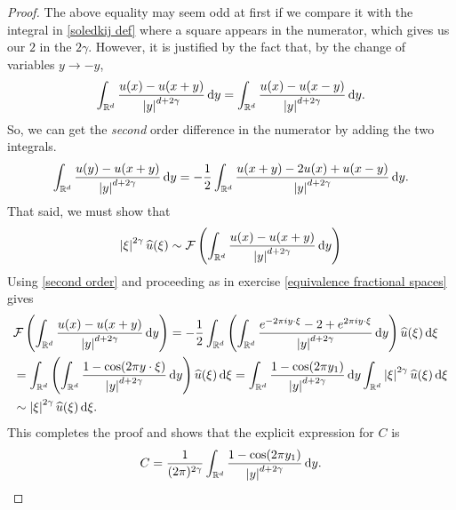 \documentclass[
    a4paper,
    DIV=14,
    abstract=true,
    numbers=noenddot
]
{scrartcl}
\theoremstyle{definition}
\newcommand{\wh}[1]{\widehat{#1}}
\renewcommand{\d}{\,\mathrm{d}}\newcommand{\dx}{\,\mathrm{d}x}
\newcommand{\R}{\mathbb{R}}
\newcommand{\Ff}{\mathcal{F}}
\begin{document}
\begin{proof}
    The above equality may seem odd at first if we compare it with the integral in \ref{soledkij def} where a square appears in the numerator, which gives us our $2$  in the $2 \gamma $. However, it is justified by the fact that, by the change of variables $y \to -y$,
    \begin{align*}
        \int_{\R^d}\frac{u(x)-u(x+y)}{\abs{y}^{d+2\gamma}}\d y=\int_{\R^d}\frac{u(x)-u(x-y)}{\abs{y}^{d+2\gamma}}\d y.
    \end{align*}
    So, we can get the \emph{second} order difference in the numerator by adding the two integrals.
    \begin{align}\label{second order}
        \int_{\R^d}\frac{u(y)-u(x+y)}{\abs{y}^{d+2\gamma}}\d y=-\frac{1}{2}\int_{\R^d}\frac{u(x+y)-2u(x)+u(x-y)}{\abs{y}^{d+2\gamma}}\d y.
    \end{align}
    That said, we must show that
    \begin{align*}
        \abs{\xi}^{2\gamma }\wh{u}(\xi )\sim \Ff \left(\int_{\R^d}\frac{u(x)-u(x+y)}{\abs{y}^{d+2\gamma}}\d y\right)
    \end{align*}
    Using \eqref{second order} and proceeding as in exercise \ref{equivalence fractional spaces} gives
    \begin{align*}
         & \Ff \left(\int_{\R^d}\frac{u(x)-u(x+y)}{\abs{y}^{d+2\gamma}}\d y\right)= -\frac{1}{2} \int_{\R^d}\left(\int_{\R^d}\frac{e^{-2\pi i y \cdot \xi}-2+e^{2\pi i y \cdot \xi}}{\abs{y}^{d+2\gamma}}\d y\right) \wh{u}(\xi)\d \xi       \\
         & =\int_{\R^d}\left(\int_{\R^d}\frac{1-\cos(2\pi y \cdot \xi)}{\abs{y}^{d+2\gamma}}\d y\right) \wh{u}(\xi)\d \xi =\int_{\R^d}  \frac{1-\cos(2\pi  y_1) }{\abs{y}^{d+2\gamma	}}\d y\int_{\R^d}\abs{\xi}^{2 \gamma }\wh{u}(\xi)\d \xi \\& \sim \abs{\xi}^{2 \gamma }\wh{u}(\xi)\d \xi.
    \end{align*}
    This completes the proof and shows that the explicit expression for $C$ is
    \begin{align*}
        C=\frac{1}{(2\pi)^{2 \gamma }}\int_{\R^d}  \frac{1-\cos(2\pi  y_1) }{\abs{y}^{d+2\gamma	}}\d y.
    \end{align*}
\end{proof}
\end{document}
